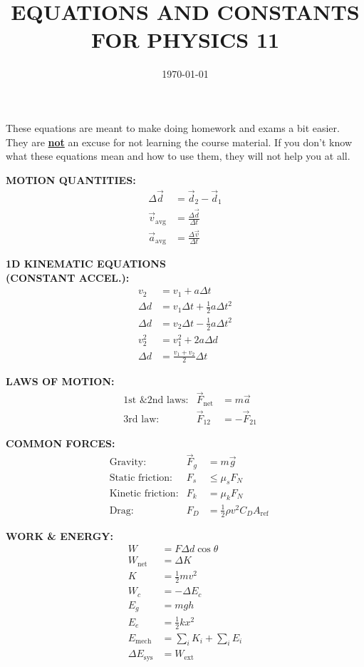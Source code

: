 \documentclass{../oss-handout}
\title{EQUATIONS AND CONSTANTS FOR PHYSICS 11}
\author{}
\date{\today}
\begin{document}
\thispagestyle{title}
\gentitle

These equations are meant to make doing homework and exams a bit easier. They
are \underline{\textbf{not}} an excuse for not learning the course material. If
you don't know what these equations mean and how to use them, they will not
help you at all.

\begin{multicols*}{3}
  \textbf{MOTION QUANTITIES:}
  \begin{align*}
    \Delta\vec d &=\vec d_2-\vec d_1 \\
    \vec v_\text{avg} &=\frac{\Delta\vec d}{\Delta t}\\
    \vec a_\text{avg} &=\frac{\Delta\vec v}{\Delta t}
  \end{align*}

  \textbf{1D KINEMATIC EQUATIONS\\(CONSTANT ACCEL.):}
  \begin{align*}
    v_2 &= v_1+ a \Delta t\\
    \Delta d &= v_1\Delta t + \frac12 a\Delta t^2\\
    \Delta d &= v_2\Delta t - \frac12 a\Delta t^2\\
    v_2^2 &= v_1^2+ 2a\Delta d \\
    \Delta d &=\frac{v_1+v_2}2 \Delta t
  \end{align*}

  \textbf{LAWS OF MOTION:}
  \begin{align*}
    &\text{1st \& 2nd laws:}&\vec F_\text{net} &=m\vec a\\\
    &\text{3rd law:}&\vec F_\text{12} &=-\vec F_\text{21}
  \end{align*}

  \textbf{COMMON FORCES:}
  \begin{align*}
    &\text{Gravity: } &\vec F_g&=m\vec g\\
    &\text{Static friction:} &F_s &\leq \mu_sF_N\\
    &\text{Kinetic friction:} &F_k &= \mu_kF_N\\
    &\text{Drag:} &F_D &= \frac12\rho v^2C_DA_\text{ref}
  \end{align*}

  \textbf{WORK \& ENERGY:}
  \begin{align*}
    W&=F\Delta d\cos\theta\\
    W_\text{net}&=\Delta K \\
    K &=\frac12 mv^2\\
    W_c &=-\Delta E_c\\%
    E_g&=mgh\\
    E_e&=\frac12kx^2\\
    E_\text{mech} &=\sum_i K_i + \sum_i E_i\\
    \Delta E_\text{sys} &=W_\text{ext}
  \end{align*}


\end{multicols*}
\end{document}
